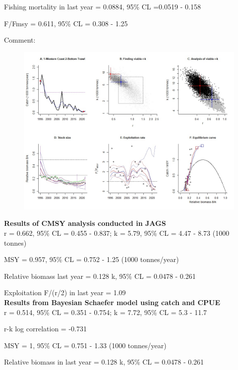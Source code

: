 \documentclass[12pt,a4paper]{article}\usepackage[]{graphicx}\usepackage[]{xcolor}
\begin{document}
Fishing mortality in last year = 0.0884, 95\% CL =0.0519 - 0.158

F/Fmsy  = 0.611, 95\% CL = 0.308 - 1.25 

 Comment:  

    \pagebreak

    \begin{figure}[ht]
    \centering
    \includegraphics[width=1.00\textwidth ext=.jpg type=jpg]{1-Western Coast 2-Bottom Trawl_AN.jpg}
    \end{figure}

    \textbf{Results of CMSY analysis conducted in JAGS}\\

r = 0.662, 95\% CL = 0.455 - 0.837; k = 5.79, 95\% CL = 4.47 - 8.73 (1000 tonnes)

MSY = 0.957, 95\% CL = 0.752 - 1.25 (1000 tonnes/year)

Relative biomass last year = 0.128 k, 95\% CL = 0.0478 - 0.261

Exploitation F/(r/2) in last year = 1.09 \\

\textbf{Results from Bayesian Schaefer model using catch and CPUE}\\

r = 0.514, 95\% CL = 0.351 - 0.754; k = 7.72, 95\% CL = 5.3 - 11.7

r-k log correlation = -0.731

MSY = 1, 95\% CL = 0.751 - 1.33 (1000 tonnes/year)

Relative biomass in last year = 0.128 k, 95\% CL = 0.0478 - 0.261
\end{document}
